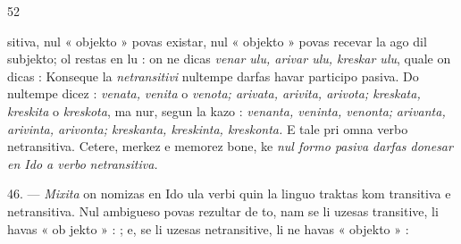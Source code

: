 \begin{VUpage}[56]{52}

\VUcontinue sitiva, nul « objekto » povas existar, nul « objekto » povas\nl
recevar la ago dil subjekto; ol restas en lu : on ne dicas\nl
\textit{venar ulu, arivar ulu, kreskar ulu}, quale on dicas : \nl
{} Konseque la \textit{netransitivi} nultempe\nl
darfas havar participo pasiva. Do nultempe dicez : \textit{venata,}\nl
\textit{venita} o \textit{venota; arivata, arivita, arivota; kreskata, kreskita}\nl
o \textit{kreskota}, ma nur, segun la kazo : \textit{venanta, veninta, venonta;}\nl
\textit{arivanta, arivinta, arivonta; kreskanta, kreskinta, kreskonta.}\nl
E tale pri omna verbo netransitiva. Cetere, merkez e memorez\nl
bone, ke \textit{nul formo pasiva darfas donesar en Ido a verbo}\nl
\textit{netransitiva.}

\VUblanc{6.48pt}%
46. --- \textit{Mixita} on nomizas en Ido ula verbi quin la linguo\nl
traktas kom transitiva e netransitiva. Nul ambigueso povas\nl
rezultar de to, nam se li uzesas transitive, li havas « ob\cc
jekto » : ; e, se li uzesas\nl
netransitive, li ne havas « objekto » : \nl
{}


\end{VUpage}
